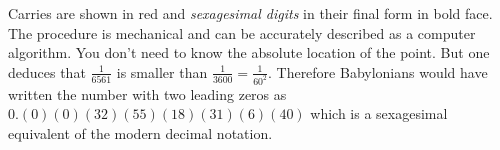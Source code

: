 Carries are shown in red and \textit{sexagesimal digits} in their final form in bold face. The procedure is mechanical and can be accurately described as a computer algorithm. You don't need to know the absolute location of the point. But one deduces that $\frac{1}{6561}$ is smaller than $\frac{1}{3600}=\frac{1}{60^2}$. Therefore Babylonians would have written the number with two leading zeros as $0.(0)(0)(32)(55)(18)(31)(6)(40)$ which is a sexagesimal equivalent of the modern decimal notation.
